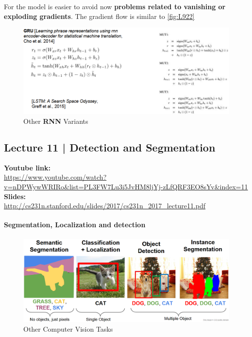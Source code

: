 \documentclass[11pt]{article}
\begin{document}
For the model is easier to avoid now \textbf{problems related to vanishing or exploding gradients}. The gradient flow is similar to \ref{fig:L922}
\begin{figure}[h]
\centering
\captionsetup{justification=centering}
\includegraphics[width=1\linewidth]{L925.pdf}
\caption{ Other \textbf{RNN} Variants}
\label{fig:L925}
\end{figure}








\clearpage
\subsection{Lecture 11 | Detection and Segmentation}
\textbf{Youtube link:}\\
\url{https://www.youtube.com/watch?v=nDPWywWRIRo&list=PL3FW7Lu3i5JvHM8ljYj-zLfQRF3EO8sYv&index=11}\\
\textbf{Slides:}\\
\url{http://cs231n.stanford.edu/slides/2017/cs231n_2017_lecture11.pdf}
\paragraph{Segmentation, Localization and detection}
\begin{figure}[h]
\centering
\captionsetup{justification=centering}
\includegraphics[width=1\linewidth]{L1010.pdf}
\caption{ Other Computer Vision Tasks}
\label{fig:L1010}
\end{figure}
\end{document}
